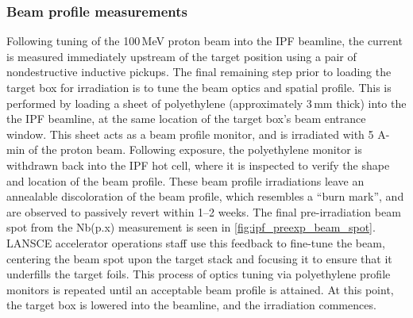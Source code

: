 \subsubsection{Beam profile measurements}



Following  tuning of the 100\,MeV proton beam into the IPF beamline, the current is measured immediately upstream of the target position using a pair of nondestructive inductive pickups.
The final remaining step prior to loading the  target box for irradiation is to tune the beam optics and spatial profile.
This is performed by loading a sheet of polyethylene (approximately 3\,mm thick) into the the IPF beamline, at the same location of the target box's beam entrance window. 
This sheet acts as a beam profile monitor, and is irradiated with 5 \mmicro A-min of the proton beam.
Following exposure, the polyethylene monitor is withdrawn back into the IPF hot cell, where it is inspected to verify the shape and location of the beam profile.
These beam profile irradiations leave an annealable discoloration of the beam profile, which resembles a \enquote{burn mark}, and are observed to passively revert within 1--2 weeks.
The final pre-irradiation beam spot from the Nb(p.x) measurement is seen in  \autoref{fig:ipf_preexp_beam_spot}.
LANSCE accelerator operations staff use this feedback to fine-tune the beam, centering the beam spot upon the target stack and focusing it to ensure that it underfills the target foils.
This process of  optics tuning via polyethylene profile monitors is repeated until an acceptable beam profile is attained.
At this point, the target box is lowered into the beamline, and the irradiation commences.
 








